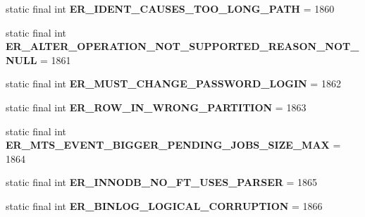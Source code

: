 \begin{DoxyCompactItemize}
static final int {\bfseries E\+R\+\_\+\+I\+D\+E\+N\+T\+\_\+\+C\+A\+U\+S\+E\+S\+\_\+\+T\+O\+O\+\_\+\+L\+O\+N\+G\+\_\+\+P\+A\+TH} = 1860
\item 
\mbox{\label{classcom_1_1mysql_1_1jdbc_1_1_mysql_error_numbers_a9ca30b9a3479218994757391b4a817ba}} 
static final int {\bfseries E\+R\+\_\+\+A\+L\+T\+E\+R\+\_\+\+O\+P\+E\+R\+A\+T\+I\+O\+N\+\_\+\+N\+O\+T\+\_\+\+S\+U\+P\+P\+O\+R\+T\+E\+D\+\_\+\+R\+E\+A\+S\+O\+N\+\_\+\+N\+O\+T\+\_\+\+N\+U\+LL} = 1861
\item 
\mbox{\label{classcom_1_1mysql_1_1jdbc_1_1_mysql_error_numbers_aa59f6af47e3f27133a33b36cc7eb8bbb}} 
static final int {\bfseries E\+R\+\_\+\+M\+U\+S\+T\+\_\+\+C\+H\+A\+N\+G\+E\+\_\+\+P\+A\+S\+S\+W\+O\+R\+D\+\_\+\+L\+O\+G\+IN} = 1862
\item 
\mbox{\label{classcom_1_1mysql_1_1jdbc_1_1_mysql_error_numbers_a9486fdbe723eb8c8018d278d3ecccafa}} 
static final int {\bfseries E\+R\+\_\+\+R\+O\+W\+\_\+\+I\+N\+\_\+\+W\+R\+O\+N\+G\+\_\+\+P\+A\+R\+T\+I\+T\+I\+ON} = 1863
\item 
\mbox{\label{classcom_1_1mysql_1_1jdbc_1_1_mysql_error_numbers_a17b384610fcfee5cf46b153ee0f722b1}} 
static final int {\bfseries E\+R\+\_\+\+M\+T\+S\+\_\+\+E\+V\+E\+N\+T\+\_\+\+B\+I\+G\+G\+E\+R\+\_\+\+P\+E\+N\+D\+I\+N\+G\+\_\+\+J\+O\+B\+S\+\_\+\+S\+I\+Z\+E\+\_\+\+M\+AX} = 1864
\item 
\mbox{\label{classcom_1_1mysql_1_1jdbc_1_1_mysql_error_numbers_ad7acb82739a74a176af114661dd430a3}} 
static final int {\bfseries E\+R\+\_\+\+I\+N\+N\+O\+D\+B\+\_\+\+N\+O\+\_\+\+F\+T\+\_\+\+U\+S\+E\+S\+\_\+\+P\+A\+R\+S\+ER} = 1865
\item 
\mbox{\label{classcom_1_1mysql_1_1jdbc_1_1_mysql_error_numbers_a981c55550595aa1efcf486de47a7ffd2}} 
static final int {\bfseries E\+R\+\_\+\+B\+I\+N\+L\+O\+G\+\_\+\+L\+O\+G\+I\+C\+A\+L\+\_\+\+C\+O\+R\+R\+U\+P\+T\+I\+ON} = 1866
\item 
\mbox{\label{classcom_1_1mysql_1_1jdbc_1_1_mysql_error_numbers_ac4b806a3c713a6208eec044d90ea52fc}} 

\end{DoxyCompactItemize}
